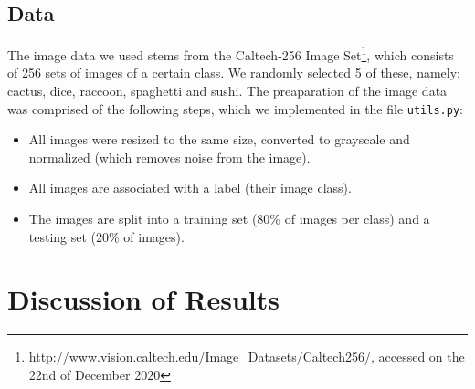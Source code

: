 \documentclass{scrartcl}
\begin{document}
\subsection{Data}
The image data we used stems from the Caltech-256 Image Set\footnote{http://www.vision.caltech.edu/Image\_Datasets/Caltech256/, accessed on the 22nd of December 2020}, which consists of 256 sets of images of a certain class. We randomly selected 5 of these, namely: cactus, dice, raccoon, spaghetti and sushi. The preaparation of the image data was comprised of the following steps, which we implemented in the file \texttt{utils.py}:
\begin{itemize}
  \item All images were resized to the same size, converted to grayscale and normalized (which removes noise from the image).
  \item All images are associated with a label (their image class).
  \item The images are split into a training set (80\% of images per class) and a testing set (20\% of images).
\end{itemize}

\section{Discussion of Results}



\end{document}
